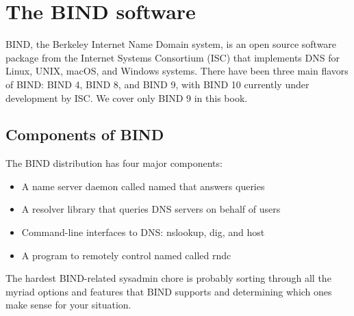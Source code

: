\section{The BIND software}
\label{part0024_split_033.htmlux5cux23_idParaDest-156}


BIND, the
\protect\hypertarget{part0024_split_033.htmlux5cux23_idIndexMarker2112}{}{}\protect\hypertarget{part0024_split_033.htmlux5cux23_idIndexMarker2113}{}{}Berkeley
Internet Name Domain system, is an open source software package from the
\protect\hypertarget{part0024_split_033.htmlux5cux23_idIndexMarker2114}{}{}Internet
Systems Consortium (ISC) that implements DNS for Linux, UNIX, macOS, and
Windows systems. There have been three main flavors of BIND: BIND 4,
BIND 8, and BIND 9, with BIND 10 currently under development by ISC. We
cover only BIND 9 in this book.

\protect\hypertarget{part0024_split_034.html}{}{}

\hypertarget{part0024_split_034.htmlux5cux23_idContainer1069}{}
\hypertarget{part0024_split_034.htmlux5cux23calibre_pb_33}{%
\subsection[Components of
BIND]{\texorpdfstring{\protect\hypertarget{part0024_split_034.htmlux5cux23_idTextAnchor893}{}{}\protect\hypertarget{part0024_split_034.htmlux5cux23_idIndexMarker2115}{}{}\protect\hypertarget{part0024_split_034.htmlux5cux23_idTextAnchor894}{}{}Components
of
BIND}{Components of BIND}}\label{part0024_split_034.htmlux5cux23calibre_pb_33}}

The BIND distribution has four major components:

\begin{itemize}
\item
  A name server daemon called {named} that answers queries
\item
  A resolver library that queries DNS servers on behalf of users
\item
  Command-line interfaces to DNS: {nslookup}, {dig}, and {host}
\item
  A program to remotely control {named} called {rndc}
\end{itemize}

The hardest BIND-related sysadmin chore is probably sorting through all
the myriad options and features that BIND supports and determining which
ones make sense for your situation.

\protect\hypertarget{part0024_split_035.html}{}{}

